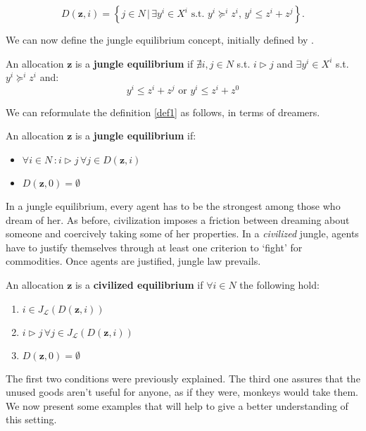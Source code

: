 \[ D(\textbf{z},i) = \left\{ j\in N\,|\,\exists y^i\in X^i \text{ s.t. } y^i\succeq^iz^i,\, y^i\leq z^i+z^j\right\}.\]

We can now define the jungle equilibrium concept, initially defined by \cite[PR]{P-R}.

\begin{definition}\label{def1}
    An allocation $\textbf{z}$ is a \textbf{jungle equilibrium} if $\nexists i,j\in N$ s.t. $i\triangleright j$ and $\exists y^i\in X^i$ s.t. $y^i\succeq^iz^i$ and:
    \[y^i\leq z^i+z^j\text{ or }y^i\leq z^i+z^0\]
\end{definition}

We can reformulate the definition \ref{def1} as follows, in terms of dreamers.

\begin{definition}\label{def2}
    An allocation $\textbf{z}$ is a \textbf{jungle equilibrium} if:
    \begin{itemize}
        \item $\forall i\in N\,:i\triangleright j\,\forall j\in D(\textbf{z},i)$
        \item $D(\textbf{z},0)=\emptyset$
    \end{itemize}
    
\end{definition}

In a jungle equilibrium, every agent has to be the strongest among those who dream of her. As before, civilization imposes a friction between dreaming about someone and coercively taking some of her properties. In a \textit{civilized} jungle, agents have to justify themselves through at least one criterion to `fight' for commodities. Once agents are justified, jungle law prevails.

\begin{definition}\label{Cequilibrium}
    An allocation $\textbf{z}$ is a \textbf{civilized equilibrium} if $\forall i\in N$ the following hold:
    \begin{enumerate}
        \item $i\in J_{\mathcal{L}}(D(\textbf{z},i))$
        \item $i\triangleright j\,\forall j\in J_{\mathcal{L}}(D(\textbf{z},i))$
        \item $D(\textbf{z},0)=\emptyset$
    \end{enumerate}
\end{definition}

The first two conditions were previously explained. The third one assures that the unused goods aren't useful for anyone, as if they were, monkeys would take them. We now present some examples that will help to give a better understanding of this setting.

